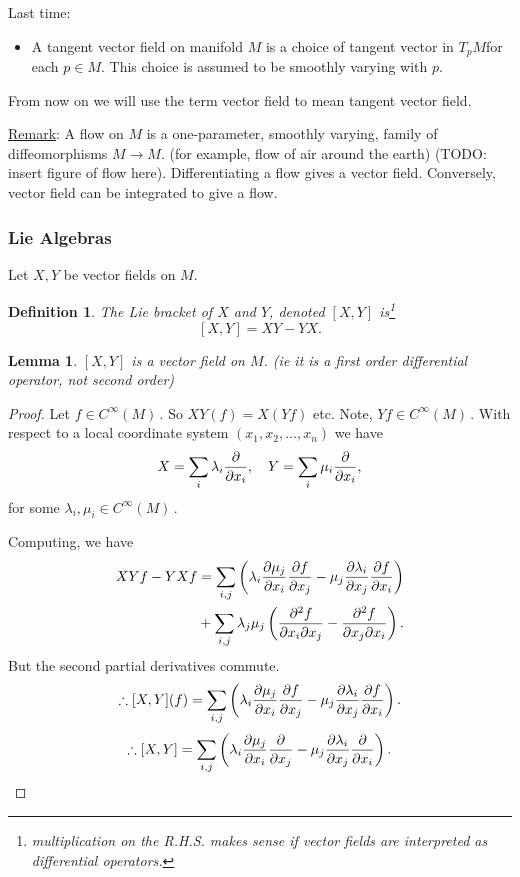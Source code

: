 \documentclass[12pt,a4paper]{article}
\newcommand{\cinfn}[1]{\ensuremath{C^{\infty}(#1)\,}}
\newcommand{\tpm}{\ensuremath{T_p M}}
\newcommand{\ul}[1]{\underline{#1}}
\newtheorem{defn}[thm]{Definition}
\newtheorem{lemma}[thm]{Lemma}
\begin{document}
Last time:

\begin{itemize}
\item A tangent vector field on manifold $M$ is a choice of tangent vector in \tpm for each $p \in M$. This choice is assumed to be smoothly varying with $p$.
\end{itemize}

From now on we will use the term vector field to mean tangent vector field.

\ul{Remark}: A flow on $M$ is a one-parameter, smoothly varying, family of diffeomorphisms $M \to M$. (for example, flow of air around the earth) (TODO: insert figure of flow here). Differentiating a flow gives a vector field. Conversely,  vector field can be integrated to give a flow.

\subsubsection{Lie Algebras}

Let $X, Y$ be vector fields on $M$.

\begin{defn}
The Lie bracket of $X$ and $Y$, denoted $[X, Y]$ is\footnote{multiplication on the R.H.S. makes sense if vector fields are interpreted as differential operators.}
\[ [X, Y] = XY - YX. \]
\end{defn}

\begin{lemma}
$[X, Y]$ is a vector field on $M$. (ie it is a first order differential operator, not second order)
\end{lemma} 

\begin{proof}
Let $f \in \cinfn{M}$. So $XY(f) = X(Yf)$ etc. Note, $Yf \in \cinfn{M}$. With respect to a local coordinate system $(x_1,x_2,\ldots, x_n)$ we have
\[ X = \sum_i \lambda_i \pdv{x_i}, \quad Y = \sum_i \mu_i \pdv{x_i}, \]
for some $\lambda_i , \mu_i \in \cinfn{M}$.

Computing, we have
\begin{align*}
XYf - YXf &=  \sum_{i,j} \left(\lambda_i \pdv{\mu_j}{x_i} \pdv{f}{x_j} 
                       - \mu_j \pdv{\lambda_i}{x_j} \pdv{f}{x_i}\right) \\
          &+ \sum_{i,j} \lambda_j\mu_j\left( \pdv{^2f}{x_i\partial x_j}
           - \pdv{^2f}{x_j\partial x_i} \right).
\end{align*}
But the second partial derivatives commute.
\[ \therefore [X, Y](f) = \sum_{i,j} \left(\lambda_i \pdv{\mu_j}{x_i} \pdv{f}{x_j} 
                       - \mu_j \pdv{\lambda_i}{x_j} \pdv{f}{x_i}\right). \]
\[ \therefore [X, Y] = \sum_{i,j} \left(\lambda_i \pdv{\mu_j}{x_i} \pdv{x_j} 
                       - \mu_j \pdv{\lambda_i}{x_j} \pdv{x_i}\right). \]
\end{proof}
\end{document}
